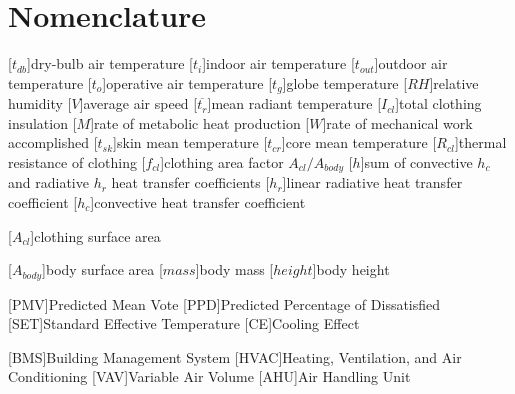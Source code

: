 
\section*{Nomenclature}
\renewcommand{\baselinestretch}{0.75}\normalsize
\begin{acronym}[longest]

[$t_{db}$]{dry-bulb air temperature}
[$t_{i}$]{indoor air temperature}
[$t_{out}$]{outdoor air temperature}
[$t_{o}$]{operative air temperature}
[$t_{g}$]{globe temperature}
[$RH$]{relative humidity\acroextra{, \%}}
[$V$]{average air speed}
[$\overline{t_{r}}$]{mean radiant temperature}
[$I_{cl}$]{total clothing insulation}
[$M$]{rate of metabolic heat production}
[$W$]{rate of mechanical work accomplished}
[$t_{sk}$]{skin mean temperature}
[$t_{cr}$]{core mean temperature}
[$R_{cl}$]{thermal resistance of clothing}
[$f_{cl}$]{clothing area factor $A_{cl}/A_{body}$}
[$h$]{sum of convective $h_{c}$ and radiative $h_{r}$ heat transfer coefficients}
[$h_{r}$]{linear radiative heat transfer coefficient}
[$h_{c}$]{convective heat transfer coefficient}

[$A_{cl}$]{clothing surface area}

[$A_{body}$]{body surface area}
[$mass$]{body mass}
[$height$]{body height}

[PMV]{Predicted Mean Vote}
[PPD]{Predicted Percentage of Dissatisfied\acroextra{, \%}}
[SET]{Standard Effective Temperature}
[CE]{Cooling Effect}

[BMS]{Building Management System}
[HVAC]{Heating, Ventilation, and Air Conditioning}
[VAV]{Variable Air Volume}
[AHU]{Air Handling Unit}


\end{acronym}
